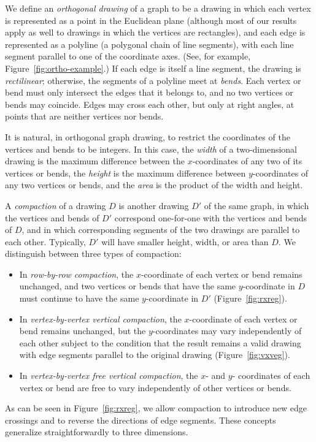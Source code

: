 \documentclass[12pt]{article}
\theoremstyle{definitions}
\begin{document}
We define an \emph{orthogonal drawing} of a graph to be a drawing in which each vertex is represented as a point in the Euclidean plane (although most of our results apply as well to drawings in which the vertices are rectangles), and each edge is represented as a polyline (a polygonal chain of line segments), with each line segment parallel to one of the coordinate axes.
(See, for example, Figure~\ref{fig:ortho-example}.)
If each edge is itself a line segment, the drawing is \emph{rectilinear}; otherwise, the segments of a polyline meet at \emph{bends}. Each vertex or bend must only intersect the edges that it belongs to, and no two vertices or bends may coincide. Edges may cross each other, but only at right angles, at points that are neither vertices nor bends.

It is natural, in orthogonal graph drawing, to restrict the coordinates of the vertices and bends to be integers. In this case, the \emph{width} of a two-dimensional drawing is the maximum difference between the $x$-coordinates of any two of its vertices or bends, the \emph{height} is the maximum difference between $y$-coordinates of any two vertices or bends, and the \emph{area} is the product of the width and height.

A \emph{compaction} of a drawing $D$ is another drawing $D'$ of the same graph, in which the vertices and bends of $D'$ correspond one-for-one with the vertices and bends of $D$, and in which corresponding segments of the two drawings are parallel to each other. Typically, $D'$ will have smaller height, width, or area than $D$. We distinguish between three types of compaction:
\begin{itemize}
\item In \emph{row-by-row compaction}, the $x$-coordinate of each vertex or bend remains unchanged, and two vertices or bends that have the same $y$-coordinate in $D$ must continue to have the same $y$-coordinate in $D'$ (Figure~\ref{fig:rxreg}).
\item In \emph{vertex-by-vertex vertical compaction},  the $x$-coordinate of each vertex or bend remains unchanged, but the $y$-coordinates may vary independently of each other subject to the condition that the result remains a valid drawing with  edge segments parallel to the original drawing (Figure~\ref{fig:vxveg}).
\item In  \emph{vertex-by-vertex free vertical compaction}, the $x$- and $y$- coordinates of each vertex or bend are free to vary independently of other vertices or bends.
\end{itemize}
As can be seen in Figure~\ref{fig:rxreg}, we allow compaction to introduce new edge crossings and to reverse the directions of edge segments.
These concepts generalize straightforwardly to three dimensions.
\end{document}
